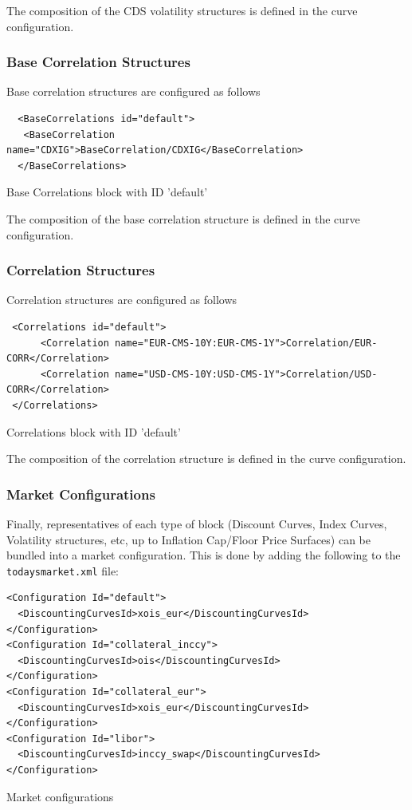 \documentclass[12pt, a4paper]{article}
\begin{document}
{{The composition of the CDS volatility structures is defined in the curve configuration.

\subsubsection{Base Correlation Structures}

Base correlation structures are configured as follows
\begin{listing}[H]
\begin{verbatim}
  <BaseCorrelations id="default">
   <BaseCorrelation name="CDXIG">BaseCorrelation/CDXIG</BaseCorrelation>
  </BaseCorrelations>
\end{verbatim}
\caption{Base Correlations block with ID 'default'}
\label{lst:basecorr_spec}
\end{listing}

The composition of the base correlation structure is defined in the curve configuration.

\subsubsection{Correlation Structures}

Correlation structures are configured as follows
\begin{listing}[H]
\begin{verbatim}
 <Correlations id="default">
      <Correlation name="EUR-CMS-10Y:EUR-CMS-1Y">Correlation/EUR-CORR</Correlation>  
      <Correlation name="USD-CMS-10Y:USD-CMS-1Y">Correlation/USD-CORR</Correlation>
 </Correlations>
\end{verbatim}
\caption{Correlations block with ID 'default'}
\label{lst:corr_spec}
\end{listing}

The composition of the correlation structure is defined in the curve configuration.
\subsubsection{Market Configurations}

Finally, representatives of each type of block (Discount Curves, Index Curves, Volatility structures, etc, up to
Inflation Cap/Floor Price Surfaces) can be bundled into a market configuration. This is done by adding the following to
the {\tt todaysmarket.xml} file:

\begin{listing}[H]
\begin{verbatim}
<Configuration Id="default">
  <DiscountingCurvesId>xois_eur</DiscountingCurvesId>
</Configuration>
<Configuration Id="collateral_inccy">
  <DiscountingCurvesId>ois</DiscountingCurvesId>
</Configuration>
<Configuration Id="collateral_eur">
  <DiscountingCurvesId>xois_eur</DiscountingCurvesId>
</Configuration>
<Configuration Id="libor">
  <DiscountingCurvesId>inccy_swap</DiscountingCurvesId>
</Configuration>
\end{verbatim}
\caption{Market configurations}
\label{lst:config_spec}
\end{listing}

}}
\end{document}
